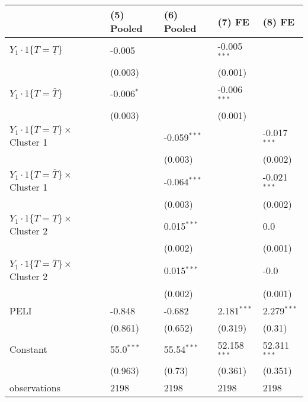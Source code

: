 \documentclass[12px]{article}
\begin{document}
 
\begin{tabular}{lllll}
\hline
 & (5) Pooled & (6) Pooled & (7) FE & (8) FE \\
\hline
$Y_1\cdot\text{1}\{T=\underline{T}\}$ & -0.005 &  & -0.005$^{***}$ &  \\
 & (0.003) &  & (0.001) &  \\
$Y_1\cdot\text{1}\{T=\bar{T}\}$ & -0.006$^{*}$ &  & -0.006$^{***}$ &  \\
 & (0.003) &  & (0.001) &  \\
$Y_1\cdot\text{1}\{T=\underline{T}\}\times$ Cluster 1 &  & -0.059$^{***}$ &  & -0.017$^{***}$ \\
 &  & (0.003) &  & (0.002) \\
$Y_1\cdot\text{1}\{T=\bar{T}\}\times$ Cluster 1 &  & -0.064$^{***}$ &  & -0.021$^{***}$ \\
 &  & (0.003) &  & (0.002) \\
$Y_1\cdot\text{1}\{T=\underline{T}\}\times$ Cluster 2 &  & 0.015$^{***}$ &  & 0.0 \\
 &  & (0.002) &  & (0.001) \\
$Y_1\cdot\text{1}\{T=\bar{T}\}\times$ Cluster 2 &  & 0.015$^{***}$ &  & -0.0 \\
 &  & (0.002) &  & (0.001) \\
PELI & -0.848 & -0.682 & 2.181$^{***}$ & 2.279$^{***}$ \\
 & (0.861) & (0.652) & (0.319) & (0.31) \\
Constant & 55.0$^{***}$ & 55.54$^{***}$ & 52.158$^{***}$ & 52.311$^{***}$ \\
 & (0.963) & (0.73) & (0.361) & (0.351) \\\hline

observations & 2198 & 2198 & 2198 & 2198 \\
\hline
\end{tabular}

 
\end{document}

